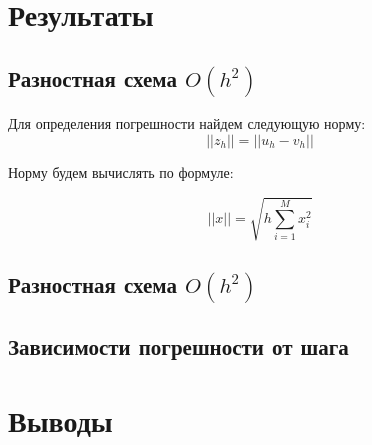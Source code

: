 \documentclass[12pt]{article}
\begin{document}
\section{Результаты}

\subsection{Разностная схема $O(h^2)$}

Для определения погрешности найдем следующую норму:
$$
||z_h|| = || u_h - v_h ||
$$

Норму будем вычислять по формуле:

$$
||x|| = \sqrt{h\sum\limits_{i=1}^M x_i^2}
$$

\subsection{Разностная схема $O(h^2)$}
\subsection{Зависимости погрешности от шага}

\section{Выводы}
\end{document}
